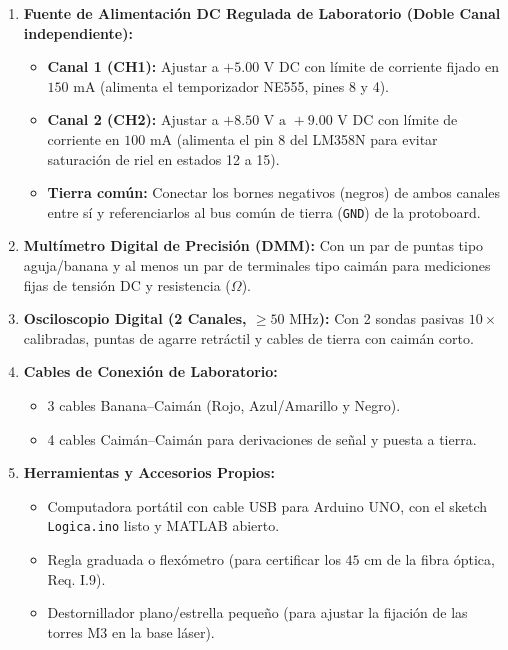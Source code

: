 \documentclass[10pt,a4paper]{article}
\begin{document}
\begin{enumerate}[leftmargin=*]
    \item \textbf{Fuente de Alimentación DC Regulada de Laboratorio (Doble Canal independiente):}
    \begin{itemize}
        \item \textbf{Canal 1 (CH1):} Ajustar a \textbf{$+5.00\text{ V}$} DC con límite de corriente fijado en $150\text{ mA}$ (alimenta el temporizador NE555, pines 8 y 4).
        \item \textbf{Canal 2 (CH2):} Ajustar a \textbf{$+8.50\text{ V}\text{ a }+9.00\text{ V}$} DC con límite de corriente en $100\text{ mA}$ (alimenta el pin 8 del LM358N para evitar saturación de riel en estados 12 a 15).
        \item \textbf{Tierra común:} Conectar los bornes negativos (negros) de ambos canales entre sí y referenciarlos al bus común de tierra (\texttt{GND}) de la protoboard.
    \end{itemize}
    \item \textbf{Multímetro Digital de Precisión (DMM):} Con un par de puntas tipo aguja/banana y al menos un par de terminales tipo caimán para mediciones fijas de tensión DC y resistencia ($\Omega$).
    \item \textbf{Osciloscopio Digital (2 Canales, $\ge 50\text{ MHz}$):} Con 2 sondas pasivas $10\times$ calibradas, puntas de agarre retráctil y cables de tierra con caimán corto.
    \item \textbf{Cables de Conexión de Laboratorio:}
    \begin{itemize}
        \item 3 cables Banana--Caimán (Rojo, Azul/Amarillo y Negro).
        \item 4 cables Caimán--Caimán para derivaciones de señal y puesta a tierra.
    \end{itemize}
    \item \textbf{Herramientas y Accesorios Propios:}
    \begin{itemize}
        \item Computadora portátil con cable USB para Arduino UNO, con el sketch \texttt{Logica.ino} listo y MATLAB abierto.
        \item Regla graduada o flexómetro (para certificar los $45\text{ cm}$ de la fibra óptica, Req. I.9).
        \item Destornillador plano/estrella pequeño (para ajustar la fijación de las torres M3 en la base láser).
    \end{itemize}
\end{enumerate}
\end{document}
